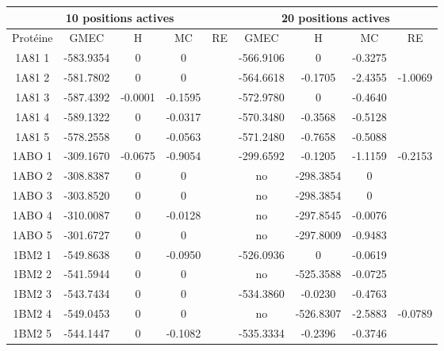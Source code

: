 \documentclass[a4paper,12pt]{article}
\begin{document}
    \begin{table}[h]
      \centering

      \begin{tabular}{|c|c|c|c|c|c|c|c|c|}


        \hline
        \multicolumn{5}{|c|}{10 positions actives}  & \multicolumn{4}{|c|}{20 positions actives} \\
        \hline
        Protéine & GMEC & H & MC & RE & GMEC & H & MC & RE \\
        \hline
        1A81 1 & -583.9354 & 0 & 0 & &                        -566.9106 & 0 & -0.3275 & \\            
        1A81 2 & -581.7802 & 0 & 0 & &                        -564.6618 & -0.1705 & -2.4355 & -1.0069 \\
        1A81 3 & -587.4392 & -0.0001 & -0.1595 & &            -572.9780 & 0 & -0.4640 & \\            
        1A81 4 & -589.1322 & 0 & -0.0317 & &                  -570.3480 & -0.3568 & -0.5128 & \\      
        1A81 5 & -578.2558 & 0 & -0.0563 & &                  -571.2480 & -0.7658 & -0.5088 & \\      
        1ABO 1 & -309.1670 & -0.0675 & -0.9054 & &            -299.6592 & -0.1205 & -1.1159 & -0.2153 \\
        1ABO 2 & -308.8387 & 0 & 0 & &                        no & -298.3854 & 0 & \\                 
        1ABO 3 & -303.8520 & 0 & 0 & &                        no & -298.3854 & 0 & \\                 
        1ABO 4 & -310.0087 & 0 & -0.0128 & &                  no & -297.8545 & -0.0076 & \\           
        1ABO 5 & -301.6727 & 0 & 0 & &                        no & -297.8009 & -0.9483 & \\           
        1BM2 1 & -549.8638 & 0 & -0.0950 & &                  -526.0936 & 0 & -0.0619 & \\            
        1BM2 2 & -541.5944 & 0 & 0 & &                        no & -525.3588 & -0.0725 & \\           
        1BM2 3 & -543.7434 & 0 & 0 & &                        -534.3860 & -0.0230 & -0.4763 & \\      
        1BM2 4 & -549.0453 & 0 & 0 & &                        no & -526.8307 & -2.5883 & -0.0789 \\   
        1BM2 5 & -544.1447 & 0 & -0.1082 & &                  -535.3334 & -0.2396 & -0.3746 & \\      

\end{tabular}
\end{table}
\end{document}
